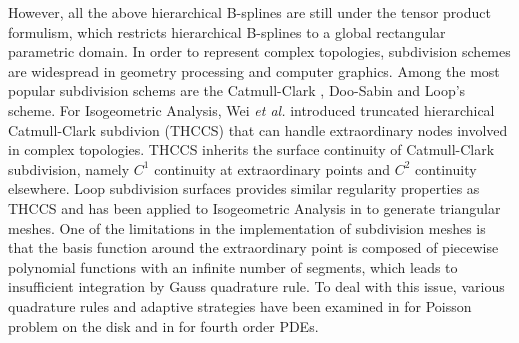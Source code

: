 \documentclass[preprint,12pt]{elsarticle}
\theoremstyle{remark}
\begin{document}
However, all the above hierarchical B-splines are still under the tensor product formulism, which restricts hierarchical B-splines to a global rectangular parametric domain. In order to represent complex topologies, subdivision schemes are widespread in geometry processing and computer graphics. Among the most popular subdivision schems are the Catmull-Clark \cite{catmull_recursively_1978}, Doo-Sabin \cite{doo_behaviour_1978} and Loop's \cite{loop_smooth_1987} scheme. For Isogeometric Analysis, Wei \textit{et al.} \cite{wei_truncated_2015} introduced truncated hierarchical Catmull-Clark subdivion (THCCS) that can handle extraordinary nodes involved in complex topologies. THCCS inherits the surface continuity of Catmull-Clark subdivision, namely $C^1$ continuity at extraordinary points and $C^2$ continuity elsewhere. Loop subdivision surfaces provides similar regularity properties as THCCS and has been applied to Isogeometric Analysis in \cite{kang_truncated_2016,pan_isogeometric_2015} to generate triangular meshes. One of the limitations in the implementation of subdivision meshes is that the basis function around the extraordinary point is composed of piecewise polynomial functions with an infinite number of segments, which leads to insufficient integration by Gauss quadrature rule. To deal with this issue, various quadrature rules and adaptive strategies have been examined in \cite{nguyen_comparative_2014} for Poisson problem on the disk and in \cite{juttler_numerical_2016} for fourth order PDEs. \par
\end{document}
